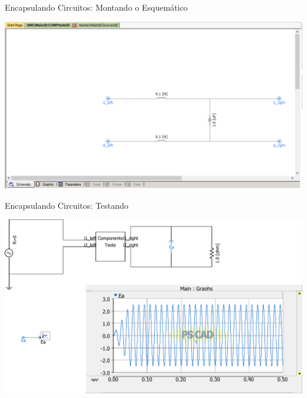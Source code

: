 \begin{frame}{Encapsulando Circuitos: Montando o Esquemático}
\centering


\includegraphics[width=0.75\linewidth]{./figuras/Componentes/schematico}


\end{frame}







\begin{frame}{Encapsulando Circuitos: Testando}
\centering


\includegraphics[width=0.75\linewidth]{./figuras/Componentes/Testando}


\end{frame}






